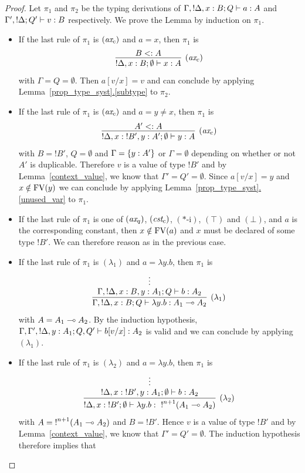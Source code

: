 \documentclass[twoside]{article}
\begin{document}
\begin{proof}
Let $\pi_1$ and $\pi_2$ be the typing derivations  of 
$\Gamma,{!}\Delta,x:B;Q \vdash a:A$ and  $\Gamma',{!}\Delta;Q' \vdash v:B$ 
respectively. We prove the Lemma by induction on $\pi_1$.
\begin{itemize}
 \item If the last rule of $\pi_1$ is $(\textit{ax}_c)$ and $a=x$, then $\pi_1$ is
 \[
   \infer[(\rul{ax}_c)]{{!}\Delta, x:B;\emptyset\entails x:A}{
     B<:A
   }
 \]
 with $\Gamma=Q=\emptyset$. Then $a[v/x]=v$ and can conclude by applying 
 Lemma~\hyperref[subtype]{\ref*{prop_type_syst}.\ref*{subtype}} to $\pi_2$.
 \item If the last rule of $\pi_1$ is $(\textit{ax}_c)$ and $a=y\neq x$, then 
 $\pi_1$ is
 \[
   \infer[(\rul{ax}_c)]{{!}\Delta, x:{!}B',y:A';\emptyset\entails y:A}{
     A'<:A
   }
 \]
 with $B={!}B'$, $Q=\emptyset$ and $\Gamma =\{y:A'\}$ or $\Gamma=\emptyset$ 
 depending on whether or not $A'$ is duplicable. Therefore $v$ is a value of 
 type ${!}B'$ and by Lemma~\hyperref[context_value]{\ref*{context_value}}, 
 we know that $\Gamma'=Q'=\emptyset$. Since $a[v/x]=y$ and $x\notin \mathop{\textrm{FV}}\nolimits(y)$ 
 we can conclude by applying
 Lemma~\hyperref[unused_var]{\ref*{prop_type_syst}.\ref*{unused_var}} to $\pi_1$.
 \item If the last rule of $\pi_1$ is one of $(\textit{ax}_q)$, $(\textit{cst}_c)$, 
 $(*\mbox{-i})$, $(\top)$ and $(\bot)$, and $a$ is the corresponding constant, 
 then $x\notin \mathop{\textrm{FV}}\nolimits(a)$ and  $x$ must be declared of some type ${!}B'$.
 We can therefore reason as in the previous case. 
 \item If the last rule of $\pi_1$ is $(\lambda_1)$ and $a=\lambda y.b$, then $\pi_1$ is
  \[
   \infer[(\lambda_1)]{\Gamma,{!}\Delta,x:B;Q\entails \lambda y.b:A_1\loli A_2}{
     \deduce[]{\Gamma, {!}\Delta,x:B,y:A_1;Q \entails b:A_2}{
       \vdots
     }
   }
 \]
 with $A=A_1\multimap A_2$. By the induction hypothesis, 
 $\Gamma, \Gamma',{!}\Delta,y:A_1;Q,Q' \vdash b[v/x]:A_2$ is valid and we can conclude
 by applying $(\lambda_1)$.
 \item If the last rule of $\pi_1$ is $(\lambda_2)$ and $a=\lambda y.b$, 
 then $\pi_1$ is
 \[
  \infer[(\lambda_2)]{{!}\Delta, x:{!}B';\emptyset \entails \lambda y.b:~{!}^{n+1}(A_1\loli A_2)}{
    \deduce[]{{!}\Delta, x:{!}B',y:A_1;\emptyset \entails b:A_2}{
      \vdots
    }
  }
 \]
 with $A={!}^{n+1}(A_1\multimap A_2)$ and $B={!}B'$. Hence $v$ is a value of type ${!}B'$ and  
 by Lemma~\hyperref[context_value]{\ref*{context_value}}, we know that
 $\Gamma'=Q'=\emptyset$. The induction hypothesis therefore implies that

\end{itemize}
\end{proof}
\end{document}
